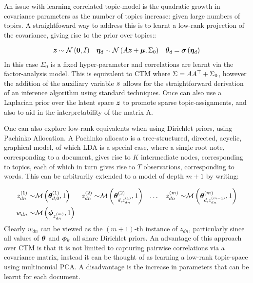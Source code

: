 An issue with learning correlated topic-model is the quadratic growth in covariance parameters as the number of topics increase: given large numbers of topics. A straightfoward way to address this is to learnt a low-rank projection of the covariance, giving rise to the prior over topics:\cite{Putthividhya2009}:

\begin{align}
\bm z & \sim \mathcal{N} \left( {\bm 0}, {I} \right) & \bm \eta_d & \sim \mathcal{N} \left( {A\bm z + \bm \mu}, {\Sigma_0} \right) & { \bm \theta_d } = \bm \sigma\left(\bm \eta_d\right) 
\end{align}
In this case $\Sigma_0$ is a fixed hyper-parameter and correlations are learnt via the factor-analysis model. This is equivalent to CTM where $\Sigma = AA^\top + \Sigma_0$, however the addition of the auxiliary variable $\bm z$ allows for the straightforward derivation of an inference algorithm using standard techniques. Once can also use a Laplacian prior over the latent space $\bm z$ to promote sparse topic-assignments\cite{Putthividhya2009}, and also to aid in the interpretability of the matrix A.

One can also explore low-rank equivalents when using Dirichlet priors, using Pachinko Allocation\cite{Li2006}. A Pachinko allocato is a tree-structured, directed, acyclic, graphical model, of which LDA is a special case,  where a single root note, corresponding to a document, gives rise to $K$ intermediate nodes, corresponding to topics, each of which in turn gives rise to $T$ observations, corresponding to words. This can be arbitrarily extended to a model of depth $m+1$ by writing:

\begin{align}
z^{(1)}_{dn} \sim & \mathcal{M} \left( {\bm \theta_{d,0}^{(1)}},{1} \right) &
z^{(2)}_{dn} \sim & \mathcal{M} \left( {\bm \theta^{(2)}_{d, z^{(1)}_{dn}}},{1} \right) & \ldots \quad
z^{(m)}_{dn} \sim & \mathcal{M} \left( {\bm \theta^{(m)}_{d, z^{(m-1)}_{dn}}},{1} \right) \\
w_{dn} \sim & \mathcal{M} \left( {\bm \phi_{z^{(m)}_{dn}}},{1} \right)
\end{align}
Clearly $w_{dn}$ can be viewed as the $(m+1)$-th instance of $z_{dn}$, particularly since all values of $\bm \theta$ and $\bm \phi_k$ all share Dirichlet priors. An advantage of this approach over CTM is that it is not limited to capturing pairwise correlations via a covariance matrix, instead it can be thought of as learning a low-rank topic-space using multinomial PCA. A disadvantage is the increase in parameters that can be learnt for each document.


